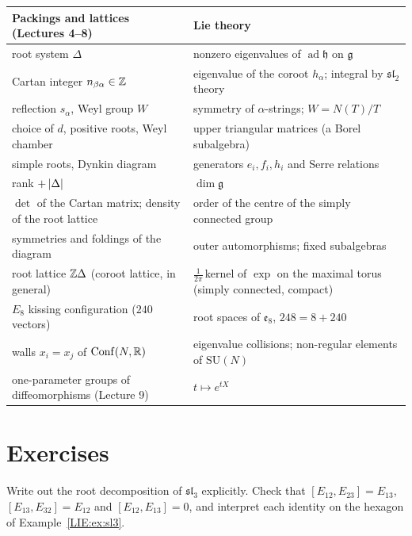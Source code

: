 \begin{center}
\renewcommand{\arraystretch}{1.25}
\begin{tabular}{p{}p{}}
\toprule
Packings and lattices (Lectures 4--8) & Lie theory\\
\midrule
root system $\Delta$ & nonzero eigenvalues of $\operatorname{ad}\mathfrak h$ on $\mathfrak g$\\
Cartan integer $n_{\beta\alpha}\in\mathbb{Z}$ & eigenvalue of the coroot $h_\alpha$; integral by $\mathfrak{sl}_2$ theory\\
reflection $s_\alpha$, Weyl group $W$ & symmetry of $\alpha$-strings; $W=N(T)/T$\\
choice of $d$, positive roots, Weyl chamber & upper triangular matrices (a Borel subalgebra)\\
simple roots, Dynkin diagram & generators $e_i,f_i,h_i$ and Serre relations\\
rank $+\left\lvert \Delta \right\rvert$ & $\dim\mathfrak g$\\
$\det$ of the Cartan matrix; density of the root lattice & order of the centre of the simply connected group\\
symmetries and foldings of the diagram & outer automorphisms; fixed subalgebras\\
root lattice $\mathbb{Z}\Delta$ (coroot lattice, in general) & $\tfrac1{2\pi}\,$kernel of $\exp$ on the maximal torus (simply connected, compact)\\
$E_8$ kissing configuration ($240$ vectors) & root spaces of $\mathfrak e_8$, $248=8+240$\\
walls $x_i=x_j$ of $\operatorname{Conf}(N,\mathbb{R})$ & eigenvalue collisions; non-regular elements of $\mathrm{SU}(N)$\\
one-parameter groups of diffeomorphisms (Lecture 9) & $t\mapsto e^{tX}$\\
\bottomrule
\end{tabular}
\end{center}

\section*{Exercises}

\begin{exercise}
Write out the root decomposition of $\mathfrak{sl}_3$ explicitly. Check that $[E_{12},E_{23}]=E_{13}$,
$[E_{13},E_{32}]=E_{12}$ and $[E_{12},E_{13}]=0$, and interpret each identity on the hexagon of
Example~\ref{LIE:ex:sl3}.
\end{exercise}

